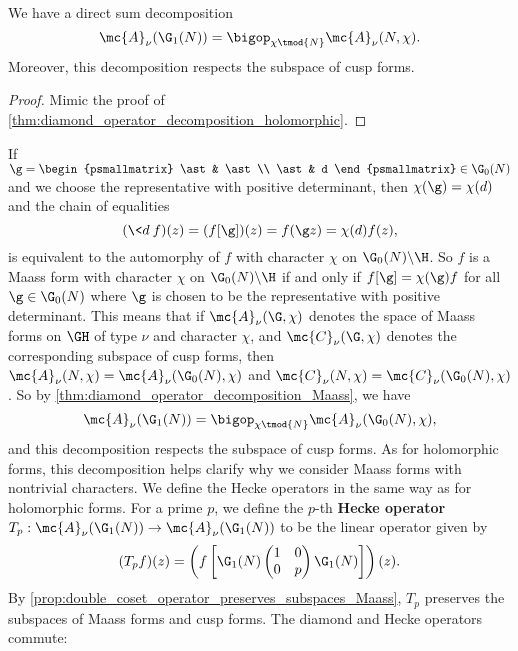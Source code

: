     \begin{proposition}\label{thm:diamond_operator_decomposition_Maass}
      We have a direct sum decomposition
      \[
        \mc{A}_{\nu}(\G_{1}(N)) = \bigop_{\chi \tmod{N}}\mc{A}_{\nu}(N,\chi).
      \]
      Moreover, this decomposition respects the subspace of cusp forms.
    \end{proposition}
    \begin{proof}
      Mimic the proof of \cref{thm:diamond_operator_decomposition_holomorphic}.
    \end{proof}

    If $\g = \begin{psmallmatrix} \ast & \ast \\ \ast & d \end{psmallmatrix} \in \G_{0}(N)$ and we choose the representative with positive determinant, then $\chi(\g) = \chi(d)$ and the chain of equalities
    \[
      (\<d\>f)(z) = (f[\g])(z) = f(\g z) = \chi(d)f(z),
    \]
    is equivalent to the automorphy of $f$ with character $\chi$ on $\G_{0}(N)\backslash\H$. So $f$ is a Maass form with character $\chi$ on $\G_{0}(N)\backslash\H$ if and only if $f[\g] = \chi(\g)f$ for all $\g \in \G_{0}(N)$ where $\g$ is chosen to be the representative with positive determinant. This means that if $\mc{A}_{\nu}(\G,\chi)$ denotes the space of Maass forms on $\GH$ of type $\nu$ and character $\chi$, and $\mc{C}_{\nu}(\G,\chi)$ denotes the corresponding subspace of cusp forms, then $\mc{A}_{\nu}(N,\chi) = \mc{A}_{\nu}(\G_{0}(N),\chi)$ and $\mc{C}_{\nu}(N,\chi) = \mc{C}_{\nu}(\G_{0}(N),\chi)$. So by \cref{thm:diamond_operator_decomposition_Maass}, we have
    \[
      \mc{A}_{\nu}(\G_{1}(N)) = \bigop_{\chi \tmod{N}}\mc{A}_{\nu}(\G_{0}(N),\chi),
    \]
    and this decomposition respects the subspace of cusp forms. As for holomorphic forms, this decomposition helps clarify why we consider Maass forms with nontrivial characters. We define the Hecke operators in the same way as for holomorphic forms. For a prime $p$, we define the $p$-th \textbf{Hecke operator} $T_{p}:\mc{A}_{\nu}(\G_{1}(N)) \to \mc{A}_{\nu}(\G_{1}(N))$ to be the linear operator given by
    \[
      (T_{p}f)(z) = \left(f\left[\G_{1}(N)\begin{pmatrix} 1 & 0 \\ 0 & p \end{pmatrix}\G_{1}(N)\right]\right)(z).
    \]
    By \cref{prop:double_coset_operator_preserves_subspaces_Maass}, $T_{p}$ preserves the subspaces of Maass forms and cusp forms. The diamond and Hecke operators commute:

